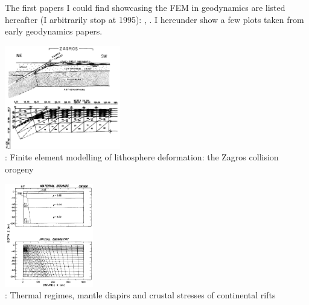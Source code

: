 
The first papers I could find showcasing the FEM in geodynamics are listed hereafter
(I arbitrarily stop at 1995):
\cite{gart78}, 
\cite{anbr80}\cite{mera80}\cite{bran80}
\cite{engl82}
\cite{thar85}
\cite{enho86}\cite{mofr86}
\cite{zupa86}
\cite{boww89}
\cite{brau94}
\cite{brbe95}.
I hereunder show a few plots taken from early geodynamics papers.


\begin{center}
\begin{minipage}{0.45\textwidth}
\centering
\includegraphics[height=4.5cm]{images/history/bird78b}\\
{: Finite element modelling of lithosphere deformation: the Zagros collision 
orogeny \cite{bird78b}}
\end{minipage}\hfill
\begin{minipage}{0.45\textwidth}
\centering
\includegraphics[height=4.5cm]{images/history/brpo81}\\
{: Thermal regimes, mantle diapirs and crustal stresses of continental rifts \cite{brpo81}}
\end{minipage}
\end{center}


